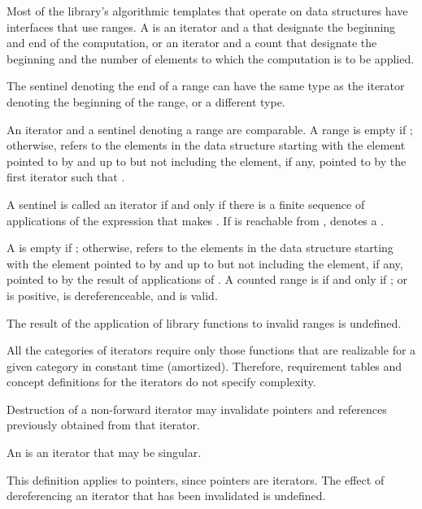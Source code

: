 \pnum
Most of the library's algorithmic templates that operate on data structures have
interfaces that use ranges. A  is an iterator and a 
that designate the beginning and end of the computation, or an iterator and a
count that designate the beginning and the number of elements to which the
computation is to be applied.
\begin{footnote}
The sentinel denoting the end of a range
can have the same type as the iterator denoting the beginning of the range, or a
different type.
\end{footnote}

\pnum
An iterator and a sentinel denoting a range are comparable.
A range 
is empty if ;
otherwise, 
refers to the elements in the data structure starting with the element
pointed to by
and up to but not including the element, if any, pointed to by
the first iterator  such that .

\pnum
A sentinel  is called  an iterator  if
and only if there is a finite sequence of applications of the expression
 that makes . If  is reachable from ,
 denotes a .

\pnum
A   is empty if ;
otherwise,  refers to
the  elements in the data structure
starting with the element pointed to by  and up to but not including
the element, if any, pointed to by
the result of  applications of .
A counted range  is  if and only if ;
or  is positive,  is dereferenceable,
and  is valid.

\pnum
The result of the application of library functions
to invalid ranges is undefined.

\pnum
All the categories of iterators require only those functions that are realizable for a given category in
constant time (amortized).
Therefore, requirement tables and concept definitions for the iterators
do not specify complexity.

\pnum
Destruction of a non-forward iterator may invalidate pointers and references
previously obtained from that iterator.

\pnum
An 
is an iterator that may be singular.
\begin{footnote}
This definition applies to pointers, since pointers are iterators.
The effect of dereferencing an iterator that has been invalidated
is undefined.
\end{footnote}


